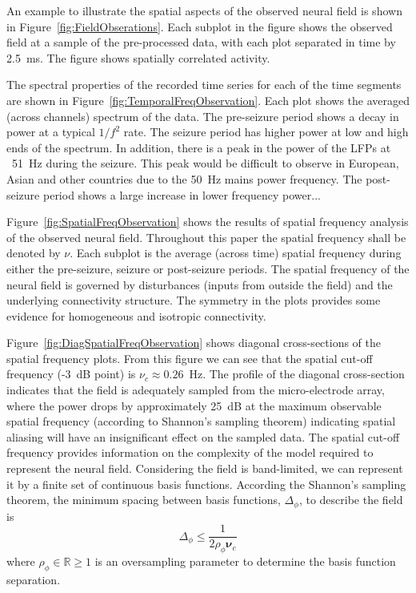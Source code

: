 \documentclass[]{article}
\begin{document}
An example to illustrate the spatial aspects of the observed neural field is shown in Figure~\ref{fig:FieldObserations}. Each subplot in the figure shows the observed field at a sample of the pre-processed data, with each plot separated in time by 2.5~ms. The figure shows spatially correlated activity.

The spectral properties of the recorded time series for each of the time segments are shown in Figure~\ref{fig:TemporalFreqObservation}. Each plot shows the averaged (across channels) spectrum of the data. The pre-seizure period shows a decay in power at a typical $1/f^2$ rate. The seizure period has higher power at low and high ends of the spectrum. In addition, there is a peak in the power of the LFPs at ~51~Hz during the seizure. This peak would be difficult to observe in European, Asian and other countries due to the 50~Hz mains power frequency. The post-seizure period shows a large increase in lower frequency power...

Figure~\ref{fig:SpatialFreqObservation} shows the results of spatial frequency analysis of the observed neural field. Throughout this paper the spatial frequency shall be denoted by $\nu$. Each subplot is the average (across time) spatial frequency during either the pre-seizure, seizure or post-seizure periods. The spatial frequency of the neural field is governed by disturbances (inputs from outside the field) and the underlying connectivity structure. The symmetry in the plots provides some evidence for homogeneous and isotropic connectivity.   

Figure~\ref{fig:DiagSpatialFreqObservation} shows diagonal cross-sections of the spatial frequency plots. From this figure we can see that the spatial cut-off frequency (-3~dB point) is $\nu_c \approx 0.26$~Hz. The profile of the diagonal cross-section indicates that the field is adequately sampled from the micro-electrode array, where the power drops by approximately 25~dB at the maximum observable spatial frequency (according to Shannon's sampling theorem) indicating spatial aliasing will have an insignificant effect on the sampled data. The spatial cut-off frequency provides information on the complexity of the model required to represent the neural field. Considering the field is band-limited, we can represent it by a finite set of continuous basis functions. According the Shannon's sampling theorem, the minimum spacing between basis functions, $\Delta_{\phi}$, to describe the field is
\begin{equation}\label{eq:BasisFunctionSeparation}
	\Delta_{\phi} \leq \frac{1}{2\rho_{\phi}\boldsymbol{\nu}_{c}}
\end{equation}
where $\rho_{\phi} \in \mathbb{R} \ge 1$ is an oversampling parameter to determine the basis function separation.
\end{document}
